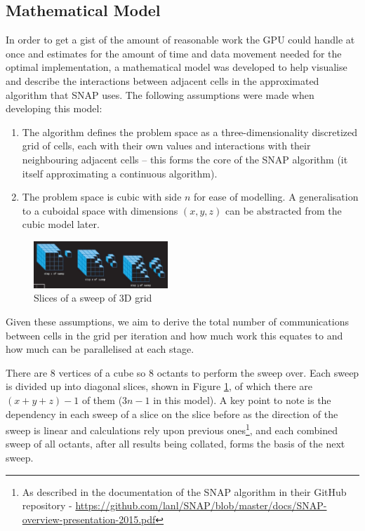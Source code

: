 \documentclass[conference]{IEEEtran}
\begin{document}
\subsection{Mathematical Model}

In order to get a gist of the amount of reasonable work the GPU could handle at once and estimates for the amount of time and data movement needed for the optimal implementation, a mathematical model was developed to help visualise and describe the interactions between adjacent cells in the approximated algorithm that SNAP uses. The following assumptions were made when developing this model:

\begin{enumerate}

\item The algorithm defines the problem space as a three-dimensionality discretized grid of cells, each with their own values and interactions with their neighbouring adjacent cells – this forms the core of the SNAP algorithm (it itself approximating a continuous algorithm).

\item The problem space is cubic with side $ n $ for ease of modelling. A generalisation to a cuboidal space with dimensions $ (x, y, z) $ can be abstracted from the cubic model later.

\end{enumerate}

\begin{figure}[h!]
\centering
\includegraphics[width=0.45\textwidth]{images/Sweep.jpg}
\caption{Slices of a sweep of 3D grid}
\label{fig:3dsweepslice}
\end{figure}

Given these assumptions, we aim to derive the total number of communications between cells in the grid per iteration and how much work this equates to and how much can be parallelised at each stage.

There are $ 8 $ vertices of a cube so $ 8 $ octants to perform the sweep over. Each sweep is divided up into diagonal slices, shown in Figure \ref{fig:3dsweepslice}, of which there are $ (x + y + z) - 1 $ of them ($ 3n - 1 $ in this model). A key point to note is the dependency in each sweep of a slice on the slice before as the direction of the sweep is linear and calculations rely upon previous ones\footnote{As described in the documentation of the SNAP algorithm in their GitHub repository - \url{ https://github.com/lanl/SNAP/blob/master/docs/SNAP-overview-presentation-2015.pdf}}, and each combined sweep of all octants, after all results being collated, forms the basis of the next sweep.
\end{document}

